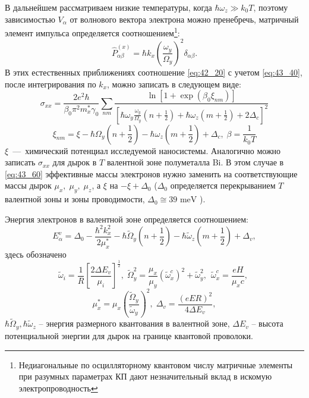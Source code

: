В дальнейшем рассматриваем низкие температуры, когда $\hbar \omega_z \gg k_0T$, поэтому зависимостью $V_{\alpha}$ от волнового вектора электрона можно пренебречь, матричный элемент импульса определяется соотношением\footnote{Недиагональные по осцилляторному квантовом числу матричные элементы при разумных параметрах КП дают незначительный вклад в искомую электропроводность}:
\[
{\hat{P}}^{\left(x\right)}_{\alpha \beta }=\hbar k_x{\left(\frac{{\omega }_y}{{\Omega }_y}\right)}^2{\delta }_{\alpha \beta }.
\]
В этих естественных приближениях соотношение \eqref{eq:42_20} с учетом \eqref{eq:43_40}, после интегрирования по $k_x$, можно записать в следующем виде:
\begin{equation} \label{eq:43_60}
\sigma_{xx}=\frac{2 e^2\hbar}{\beta_0 \pi^2 m^*_x \gamma_0} \sum_{nm}{\frac{\ln \left[1+\exp\left(\beta_0 \xi_{nm}\right)\right]}{{\left[\hbar {\omega }_y\frac{\omega_y}{\Omega_y}\left(n+\frac{1}{2}\right)+\hbar \omega_z\left(m+\frac{1}{2}\right)+2\Delta_c\right]}^2}} 
\end{equation}
\[
\xi_{nm}=\xi -\hbar \Omega_y \left(n+\frac{1}{2}\right)-\hbar \omega_z\left(m+\frac{1}{2}\right)+\Delta_c,\;
\beta =\frac{1}{k_0 T}
\]
$\xi $~---~химический потенциал исследуемой наносистемы. Аналогично можно записать $\sigma_{xx}$ для дырок в $T$ валентной зоне полуметалла Bi. В этом случае в \eqref{eq:43_60} эффективные массы электронов нужно заменить на соответствующие массы дырок $\mu_x,\; \mu_y,\; \mu_z$, а $\xi$  на $-\xi +\Delta_0$ ($\Delta_0$ определяется перекрыванием $T$ валентной зоны и зоны проводимости, $\Delta_0\cong 39\text{ meV}$ \cite{Levin2009a}). 

Энергия электронов в валентной зоне определяется соотношением:
\[
E^v_{\alpha }={\Delta }_0-\frac{{\hbar }^2k^2_x}{2{\mu }^*_x}-\hbar {\widetilde{\Omega }}_y\left(n+\frac{1}{2}\right)-\hbar {\widetilde{\omega }}_z\left(m+\frac{1}{2}\right)+{\Delta }_v,
\] 
здесь обозначено
\[
\widetilde{\omega}_i=\frac{1}{R}{\left[\frac{2 \Delta E_v}{\mu_i}\right]}^{\frac{1}{2}},\;
{\widetilde{\Omega }}^2_y=\frac{\mu_x}{\mu_y}{\left({\widetilde{\omega }}^c_x\right)}^2+{\widetilde{\omega }}^2_y,\ \ {\widetilde{\omega }}^c_x=\frac{eH}{{\mu }_xc},\;
\]
\[
\mu^*_x=\mu_x{\left(\frac{{\widetilde{\Omega}}_y}{{\widetilde{\omega}}_y}\right)}^2,\;
\Delta_v = \frac{{\left(eER\right)}^2}{4\Delta E_v},
\]
$\hbar {\widetilde{\Omega }}_y, \hbar {\widetilde{\omega }}_z$ -- энергия размерного квантования в валентной зоне, $\Delta E_v$ -- высота потенциальной энергии для дырок на границе квантовой проволоки.

